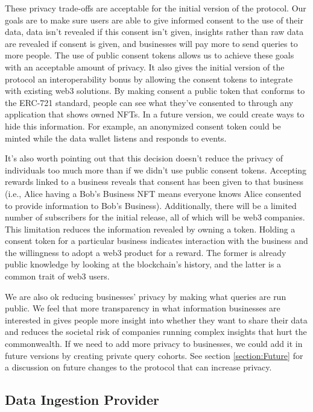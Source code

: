 These privacy trade-offs are acceptable for the initial version of the protocol. Our goals are to make sure users are able to give informed consent to the 
use of their data, data isn't revealed if this consent isn't given, insights rather than raw data are revealed if consent is given, and businesses will pay 
more to send queries to more people. The use of public consent tokens allows us to achieve these goals with an acceptable amount of privacy. It also gives 
the initial version of the protocol an interoperability bonus by allowing the consent tokens to integrate with existing web3 solutions. By making consent a 
public token that conforms to the ERC-721 standard, people can see what they've consented to through any application that shows owned NFTs. In a future 
version, we could create ways to hide this information. For example, an anonymized consent token could be minted while the data wallet listens and responds 
to events. %


It's also worth pointing out that this decision doesn't reduce the privacy of individuals too much more than if we didn't use public consent tokens. Accepting 
rewards linked to a business reveals that consent has been given to that business (i.e., Alice having a Bob's Business NFT means everyone knows Alice consented 
to provide information to Bob's Business). Additionally, there will be a limited number of subscribers for the initial release, all of which will be web3 
companies. This limitation reduces the information revealed by owning a token. Holding a consent token for a particular business indicates interaction with 
the business and the willingness to adopt a web3 product for a reward. The former is already public knowledge by looking at the blockchain's history, and the 
latter is a common trait of web3 users.


We are also ok reducing businesses' privacy by making what queries are run public. We feel that more transparency in what information businesses are interested 
in gives people more insight into whether they want to share their data and reduces the societal risk of companies running complex insights that hurt the 
commonwealth. If we need to add more privacy to businesses, we could add it in future versions by creating private query cohorts. See section \ref{section:Future} 
for a discussion on future changes to the protocol that can increase privacy.

\subsection{Data Ingestion Provider} %

